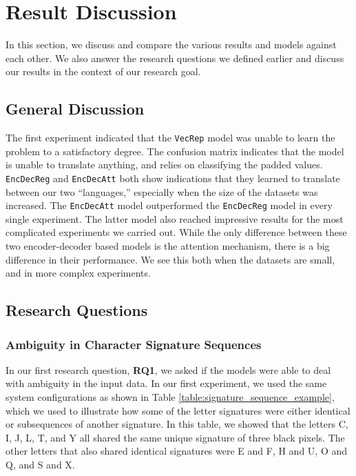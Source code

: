 
\section{Result Discussion}
\label{sec:result_discussion}
In this section, we discuss and compare the various results and models against each other. We also answer the research questions we defined earlier and discuss our results in the context of our research goal.

\subsection{General Discussion}
The first experiment indicated that the {\tt VecRep} model was unable to learn the problem to a satisfactory degree. The confusion matrix indicates that the model is unable to translate anything, and relies on classifying the padded values. {\tt EncDecReg} and {\tt EncDecAtt} both show indications that they learned to translate between our two ``languages,'' especially when the size of the datasets was increased. The {\tt EncDecAtt} model outperformed the {\tt EncDecReg} model in every single experiment. The latter model also reached impressive results for the most complicated experiments we carried out. While the only difference between these two encoder-decoder based models is the attention mechanism, there is a big difference in their performance. We see this both when the datasets are small, and in more complex experiments.

\subsection{Research Questions}

\subsubsection{Ambiguity in Character Signature Sequences}
In our first research question, \textbf{RQ1}, we asked if the models were able to deal with ambiguity in the input data. In our first experiment, we used the same system configurations as shown in Table \ref{table:signature_sequence_example}, which we used to illustrate how some of the letter signatures were either identical or subsequences of another signature. In this table, we showed that the letters C, I, J, L, T, and Y all shared the same unique signature of three black pixels. The other letters that also shared identical signatures were E and F, H and U, O and Q, and S and X. 

